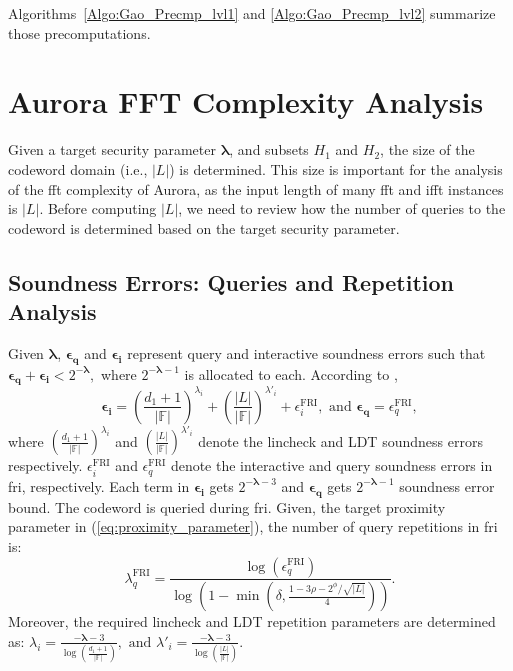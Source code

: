 Algorithms~\ref{Algo:Gao_Precmp_lvl1} and \ref{Algo:Gao_Precmp_lvl2} summarize those precomputations.


\section{Aurora FFT Complexity Analysis} \label{Sec:FFT_Calls_in_Aurora}
Given a target security parameter $\boldsymbol{\lambda}$, and subsets $H_1$ and $H_2$,
the size of the codeword domain (i.e., $|L|$) is determined. This size is important for the analysis of the \gls{fft} complexity of Aurora, as the input length of many \gls{fft} and \gls{ifft} instances is $|L|$. Before computing $|L|$, we need to review how the number of queries to the  codeword is determined based on the target security parameter.

\subsection{Soundness Errors: Queries and Repetition Analysis}
Given $\boldsymbol{\lambda}$, $\boldsymbol{\epsilon_q}$ and $\boldsymbol{\epsilon_i}$ represent query and interactive soundness errors such that
\(
\boldsymbol{\epsilon_q} + \boldsymbol{\epsilon_i} < 2^{-\boldsymbol{\lambda}},
\)
where $2^{-\boldsymbol{\lambda} - 1}$ is allocated to each. According to \cite[Theorem 4]{Aurora2019}, 
\[
\boldsymbol{\epsilon_i} = \left(\frac{d_1 + 1}{|\mathbb{F}|}\right)^{\lambda_i} + \left(\frac{|L|}{|\mathbb{F}|}\right)^{\lambda'_i} + \epsilon^{\text{FRI}}_i,\text{ and } \boldsymbol{\epsilon_q} = \epsilon^{\text{FRI}}_q,
\]
where $ \left(\frac{d_1 + 1}{|\mathbb{F}|}\right)^{\lambda_i}$ and $\left(\frac{|L|}{|\mathbb{F}|}\right)^{\lambda'_i}$ denote the lincheck and LDT soundness errors respectively. $\epsilon^{\text{FRI}}_i$ and   $\epsilon^{\text{FRI}}_q$ denote the interactive and query soundness errors in \gls{fri}, respectively. Each term in $\boldsymbol{\epsilon_i}$ gets $2^{-\boldsymbol{\lambda} - 3}$ and $\boldsymbol{\epsilon_q}$ gets $2^{-\boldsymbol{\lambda} - 1}$ soundness error bound. 
The codeword is queried during \gls{fri}. 
Given, the target proximity parameter in (\ref{eq:proximity_parameter}), the number of query repetitions in \gls{fri} is:
\begin{equation}\label{eq:num_queries}
	\lambda_q^\text{FRI} = \frac{\log(\epsilon^{\text{FRI}}_q)}{\log\left( 1 - \min\left(\delta,  \frac{1- 3\rho - 2^\phi/\sqrt{|L|}}{4} \right)  \right)}.  
\end{equation}
Moreover, the required lincheck and LDT repetition parameters are determined as:
\(
\lambda_i = \frac{-\boldsymbol{\lambda} - 3}{\log\left(\frac{d_1+1}{|\mathbb{F}|}\right)},\text{ and } \lambda'_i = \frac{-\boldsymbol{\lambda} - 3}{\log\left(\frac{|L|}{|\mathbb{F}|}\right)}.
\)



